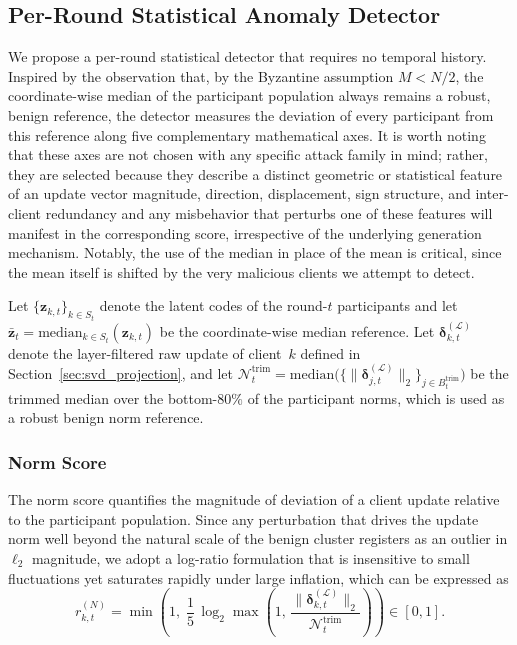 \documentclass[journal]{IEEEtran}
\begin{document}
\subsection{Per-Round Statistical Anomaly Detector}
\label{sec:stat_detector}

We propose a per-round statistical detector that requires no temporal history. Inspired by the observation that, by the Byzantine assumption $M < N/2$, the coordinate-wise median of the participant population always remains a robust, benign reference, the detector measures the deviation of every participant from this reference along five complementary mathematical axes. It is worth noting that these axes are not chosen with any specific attack family in mind; rather, they are selected because they describe a distinct geometric or statistical feature of an update vector magnitude, direction, displacement, sign structure, and inter-client redundancy and any misbehavior that perturbs one of these features will manifest in the corresponding score, irrespective of the underlying generation mechanism. Notably, the use of the median in place of the mean is critical, since the mean itself is shifted by the very malicious clients we attempt to detect.

Let $\{\mathbf{z}_{k,t}\}_{k\in S_t}$ denote the latent codes of the round-$t$ participants and let $\bar{\mathbf{z}}_t = \mathrm{median}_{k \in S_t}(\mathbf{z}_{k,t})$ be the coordinate-wise median reference. Let $\boldsymbol{\delta}_{k,t}^{(\mathcal{L})}$ denote the layer-filtered raw update of client~$k$ defined in Section~\ref{sec:svd_projection}, and let $\mathcal{N}_t^{\mathrm{trim}} = \mathrm{median}\bigl(\bigl\{\|\boldsymbol{\delta}_{j,t}^{(\mathcal{L})}\|_2\bigr\}_{j \in B_t^{\mathrm{trim}}}\bigr)$ be the trimmed median over the bottom-$80\%$ of the participant norms, which is used as a robust benign norm reference.

\subsubsection{Norm Score}
The norm score quantifies the magnitude of deviation of a client update relative to the participant population. Since any perturbation that drives the update norm well beyond the natural scale of the benign cluster registers as an outlier in $\ell_2$ magnitude, we adopt a log-ratio formulation that is insensitive to small fluctuations yet saturates rapidly under large inflation, which can be expressed as
\begin{equation}
r_{k,t}^{(N)} = \min\!\left(1,\; \frac{1}{5}\,\log_2\max\!\left(1,\, \frac{\|\boldsymbol{\delta}_{k,t}^{(\mathcal{L})}\|_2}{\mathcal{N}_t^{\mathrm{trim}}}\right)\right) \in [0,1].
\label{eq:norm_score}
\end{equation}
\end{document}
